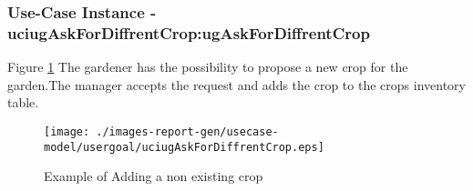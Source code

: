 
	\subsubsection{Use-Case Instance - uciugAskForDiffrentCrop:ugAskForDiffrentCrop}
	

	
	Figure \ref{fig:lu.uni.lassy.excalibur.group01.excalibur-RE-UC-uciugAskForDiffrentCrop}
	The gardener has the possibility to propose a new crop for the garden.The manager accepts the request and 
	adds the crop to the crops inventory table.
	
	\begin{figure}[htbp]
	\begin{center}
	
	\texttt{[image: ./images-report-gen/usecase-model/usergoal/uciugAskForDiffrentCrop.eps]}
	\end{center}
	\caption[lu.uni.lassy.excalibur.group01.excalibur Sequence Diagram: uciugAskForDiffrentCrop]{Example of Adding a non existing crop}
	\label{fig:lu.uni.lassy.excalibur.group01.excalibur-RE-UC-uciugAskForDiffrentCrop}
	\end{figure}
	\vspace{0.5cm}
